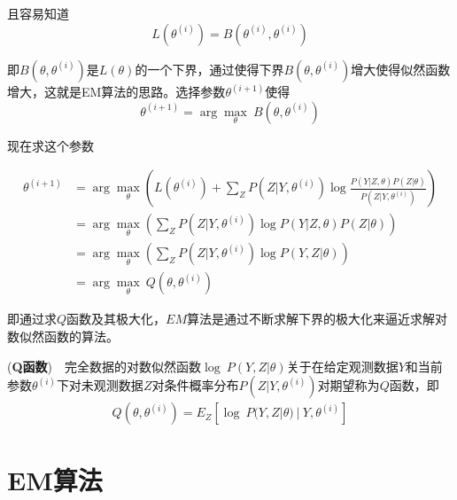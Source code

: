 且容易知道
\begin{equation}
    L(\theta^{(i)})= B(\theta^{(i)},\theta^{(i)})
\end{equation}

即$B(\theta,\theta^{(i)})$是$L(\theta)$的一个下界，通过使得下界$B(\theta,\theta^{(i)})$增大使得似然函数增大，这就是EM算法的思路。选择参数$\theta^{(i+1)}$使得
\begin{equation}
    \theta^{(i+1)}=\arg \max_{\theta}\ B(\theta,\theta^{(i)})
\end{equation}

现在求这个参数

\begin{equation}
    \begin{aligned}
        \theta^{(i+1)}&=\arg \max_{\theta}\left(L(\theta^{(i)}) + \sum_{Z}P(Z|Y,\theta^{(i)})\log \frac{P(Y|Z,\theta)P(Z|\theta)}{P(Z|Y,\theta^{(i)})}\right)\\
        &=\arg \max_{\theta}\left(\sum_{Z}P(Z|Y,\theta^{(i)})\log P(Y|Z,\theta)P(Z|\theta)\right)\\
        &=\arg \max_{\theta}\left(\sum_{Z}P(Z|Y,\theta^{(i)})\log P(Y,Z|\theta)\right)\\
        &=\arg \max_{\theta}\ Q(\theta,\theta^{(i)})
    \end{aligned}
\end{equation}

即通过求$Q$函数及其极大化，$EM$算法是通过不断求解下界的极大化来逼近求解对数似然函数的算法。

\begin{framed}
    \begin{define}
        (\textbf{Q函数})\ \ 完全数据的对数似然函数$\log\ P(Y,Z|\theta)$关于在给定观测数据$Y$和当前参数$\theta^{(i)}$下对未观测数据$Z$对条件概率分布$P(Z|Y,\theta^{(i)})$对期望称为$Q$函数，即
        \begin{eqnarray}
            Q(\theta,\theta^{(i)})=E_Z\left[\log\ P(Y,Z|\theta)\ |\ Y,\theta^{(i)}\right]
        \end{eqnarray}
    \end{define}
\end{framed}

\section{EM算法}

